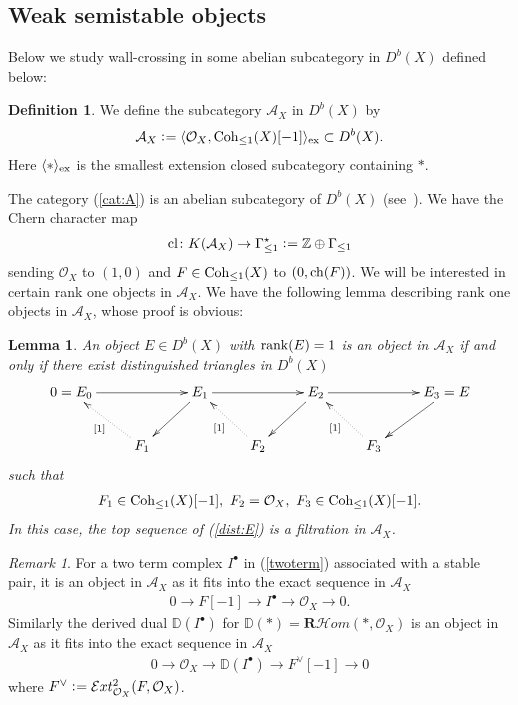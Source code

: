 \documentclass[11pt]{amsart}
\theoremstyle{plain}
\newtheorem{lem}[thm]{Lemma}
\theoremstyle{definition}
\newtheorem{defi}[thm]{Definition}
\theoremstyle{remark}
\newtheorem{rmk}[thm]{Remark}
\newcommand{\aA}{\mathcal{A}}
\newcommand{\eE}{\mathcal{E}}
\newcommand{\hH}{\mathcal{H}}
\newcommand{\oO}{\mathcal{O}}
\newcommand{\dR}{\mathbf{R}}
\newcommand{\ch}{\mathop{\rm ch}\nolimits}
\newcommand{\rank}{\mathop{\rm rank}\nolimits}
\newcommand{\Coh}{\mathop{\rm Coh}\nolimits}
\newcommand{\cl}{\mathop{\rm cl}\nolimits}
\begin{document}
\subsection{Weak semistable objects}
Below we study wall-crossing in
some abelian subcategory in $D^b(X)$
defined below: 
\begin{defi}
We define the subcategory $\aA_X$ in $D^b(X)$ by 
\begin{align}\label{cat:A}
\aA_X \cneq \langle \oO_X, \Coh_{\le 1}(X)[-1] \rangle_{\rm{ex}} \subset 
D^b(X).
\end{align}
Here $\langle \ast \rangle_{\rm{ex}}$ is the smallest extension 
closed subcategory containing $\ast$. 
\end{defi}
The category (\ref{cat:A}) is an abelian subcategory
of $D^b(X)$
(see~\cite[Lemma~6.2]{Tcurve1}). 
We have the Chern character map
\begin{align}\label{cl:AX}
\cl \colon K(\aA_X) \to \Gamma_{\le 1}^{\star}
\cneq \mathbb{Z} \oplus \Gamma_{\le 1}
\end{align}
sending $\oO_X$ to $(1, 0)$ and 
$F \in \Coh_{\le 1}(X)$ to 
$(0, \ch(F))$. 
We will be interested in certain rank one objects in 
$\aA_X$. 
We have the following lemma describing 
rank one objects in $\aA_X$, whose 
proof is obvious: 
\begin{lem}
An object $E \in D^b(X)$ with
$\rank(E)=1$
is an object in $\aA_X$ if and only if there 
exist distinguished triangles in $D^b(X)$
\begin{align}\label{dist:E}
\xymatrix{
0=E_0 \ar[rr] & & E_1 \ar[ld]    \ar[rr]    &  & E_2 \ar[dl] \ar[rr] &  & E_3=E \ar[dl] \\
    &  F_1 \ar@{.>}[lu]^-{[1]} &  &  F_2 \ar@{.>}[lu]^-{[1]}  & 
&  F_3 \ar@{.>}[lu]^-{[1]} &
}
\end{align}
such that 
\begin{align*}
F_1 \in \Coh_{\le 1}(X)[-1], \ 
F_2=\oO_X, \ F_3 \in \Coh_{\le 1}(X)[-1].
\end{align*}
In this case, 
the top sequence of (\ref{dist:E}) is a filtration in $\aA_X$. 
\end{lem}

\begin{rmk}\label{rmk:IA}
For a two term complex $I^{\bullet}$ in (\ref{twoterm})
associated with a stable pair, 
it
is an object in $\aA_X$ as it fits into the exact sequence in $\aA_X$
\begin{align*}
0 \to F[-1] \to I^{\bullet} \to \oO_X \to 0.
\end{align*}
Similarly the derived dual 
$\mathbb{D}(I^{\bullet})$
for $\mathbb{D}(\ast)=\dR \hH om(\ast, \oO_X)$
is an object in $\aA_X$ as it fits into the exact sequence in $\aA_X$
\begin{align*}
0 \to \oO_X \to \mathbb{D}(I^{\bullet}) \to F^{\vee}[-1] \to 0
\end{align*}
where $F^{\vee} \cneq \eE xt^2_{\oO_X}(F, \oO_X)$. 
\end{rmk}
\end{document}
